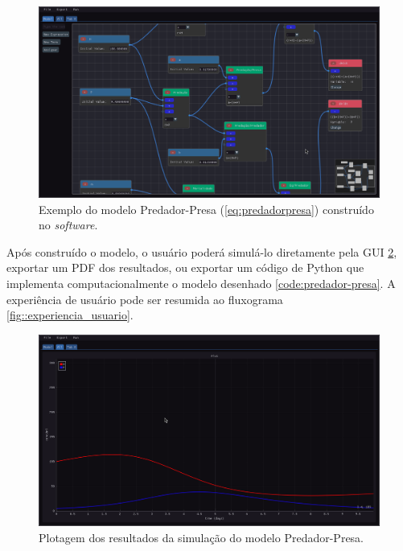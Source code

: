 \documentclass[
	12pt,				%
	openright,			%
	oneside,			%
	a4paper,			%
	main=brazil,
	english,			%
	]{ufsj-abntex2}
\begin{document}
\begin{figure}[h]
    \centering
    \includegraphics[scale=0.35]{imgs/ode-designer/predador-presa.png} 
    \caption{Exemplo do modelo Predador-Presa (\ref{eq:predadorpresa}) construído no \textit{software}.}
    \label{fig:gui-predador-presa}
\end{figure}

Após construído o modelo, o usuário poderá simulá-lo diretamente pela GUI \ref{fig:gui-grafico-all}, exportar um PDF dos resultados, ou exportar um código de Python que implementa computacionalmente o modelo desenhado \ref{code:predador-presa}. A experiência de usuário pode ser resumida ao fluxograma \ref{fig::experiencia_usuario}.

\begin{figure}[h]
    \centering
    \includegraphics[scale=0.35]{imgs/ode-designer/grafico-all.png} 
    \caption{Plotagem dos resultados da simulação do modelo Predador-Presa.}
    \label{fig:gui-grafico-all}
\end{figure}
\end{document}
